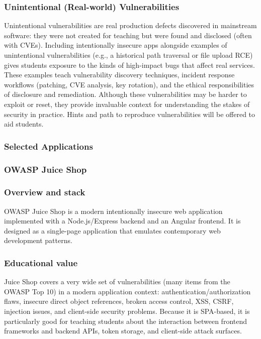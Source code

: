 \documentclass[12pt]{article}
\begin{document}
\subsubsection*{Unintentional (Real-world) Vulnerabilities}
Unintentional vulnerabilities are real production defects discovered in mainstream software: they were not created for teaching but were found and disclosed (often with CVEs). Including intentionally insecure apps alongside examples of unintentional vulnerabilities (e.g., a historical path traversal or file upload RCE) gives students exposure to the kinds of high-impact bugs that affect real services. These examples teach vulnerability discovery techniques, incident response workflows (patching, CVE analysis, key rotation), and the ethical responsibilities of disclosure and remediation. Although these vulnerabilities may be harder to exploit or reset, they provide invaluable context for understanding the stakes of security in practice. Hints and path to reproduce vulnerabilities will be offered to aid students.

\subsubsection{Selected Applications}

\subsubsection{OWASP Juice Shop}

\subsubsection*{Overview and stack}
OWASP Juice Shop is a modern intentionally insecure web application implemented with a Node.js/Express backend and an Angular frontend. It is designed as a single-page application that emulates contemporary web development patterns.

\subsubsection*{Educational value}	
Juice Shop covers a very wide set of vulnerabilities (many items from the OWASP Top 10) in a modern application context: authentication/authorization flaws, insecure direct object references, broken access control, XSS, CSRF, injection issues, and client-side security problems. Because it is SPA-based, it is particularly good for teaching students about the interaction between frontend frameworks and backend APIs, token storage, and client-side attack surfaces.
\end{document}
